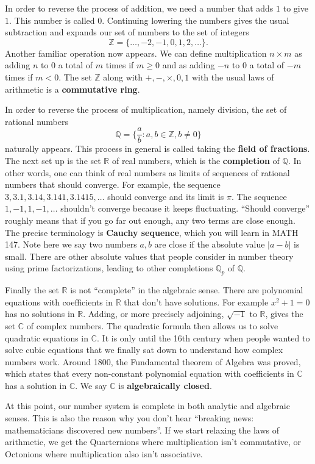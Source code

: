 \documentclass{article}
\def\Z{{\mathbb Z}}
\def\R{{\mathbb R}}
\def\Q{{\mathbb Q}}
\def\Z{{\mathbb Z}}
\def\Q{{\mathbb Q}}
\def\C{{\mathbb C}}
\begin{document}
In order to reverse the process of addition, we need a number that adds $1$ to give $1$. This number is called $0$. Continuing lowering the numbers gives the usual subtraction and expands our set of numbers to the set of integers
$$\Z = \{\ldots,-2,-1,0,1,2,\ldots\}.$$
Another familiar operation now appears. We can define multiplication $n\times m$ as adding $n$ to $0$ a total of $m$ times if $m\geq0$ and as adding $-n$ to $0$ a total of $-m$ times if $m < 0$. The set $\Z$ along with $+,-,\times,0,1$ with the usual laws of arithmetic is a \textbf{commutative ring}. 

In order to reverse the process of multiplication, namely division, the set of rational numbers
$$\Q = \{\frac{a}{b}\colon a,b\in\Z, b\neq 0\}$$
naturally appears. This process in general is called taking the \textbf{field of fractions}.
The next set up is the set $\R$ of real numbers, which is the \textbf{completion} of $\Q$. In other words, one can think of real numbers as limits of sequences of rational numbers that should converge. For example, the sequence $3, 3.1, 3.14, 3.141, 3.1415, \ldots$  should converge and its limit is $\pi$. The sequence $1, -1, 1, -1, \ldots$ shouldn't converge because it keeps fluctuating. ``Should converge'' roughly means that if you go far out enough, any two terms are close enough. The precise terminology is \textbf{Cauchy sequence}, which you will learn in MATH 147. Note here we say two numbers $a,b$ are close if the absolute value $|a - b|$ is small. There are other absolute values that people consider in number theory using prime factorizations, leading to other completions $\Q_p$ of $\Q$.

Finally the set $\R$ is not ``complete'' in the algebraic sense. There are polynomial equations with coefficients in $\R$ that don't have solutions. For example $x^2 + 1 = 0$ has no solutions in $\R$. Adding, or more precisely adjoining, $\sqrt{-1}$ to $\R$, gives the set $\C$ of complex numbers. The quadratic formula then allows us to solve quadratic equations in $\C$. It is only until the 16th century when people wanted to solve cubic equations that we finally sat down to understand how complex numbers work. Around 1800, the Fundamental theorem of Algebra was proved, which states that every non-constant polynomial equation with coefficients in $\C$ has a solution in $\C$. We say $\C$ is \textbf{algebraically closed}. 

At this point, our number system is complete in both analytic and algebraic senses. This is also the reason why you don't hear ``breaking news: mathematicians discovered new numbers''. If we start relaxing the laws of arithmetic, we get the Quarternions where multiplication isn't commutative, or Octonions where multiplication also isn't associative.
\end{document}

